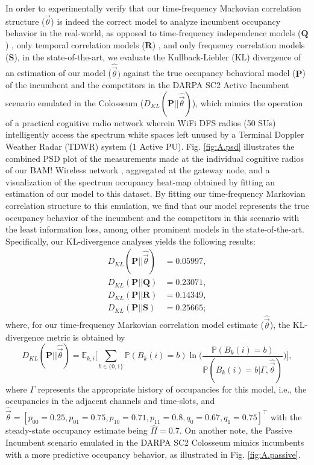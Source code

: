 \documentclass[12pt, draftcls, onecolumn]{IEEEtran}
\begin{document}
In order to experimentally verify that our time-frequency Markovian correlation structure ($\vec{\theta}$) is indeed the correct model to analyze incumbent occupancy behavior in the real-world, as opposed to time-frequency independence models ($\mathbf{Q}$) \cite{WCL:4, WCL:10, WCL:9, WCL:11, WCL:8}, only temporal correlation models ($\mathbf{R}$) \cite{WCL:5}, and only frequency correlation models ($\mathbf{S}$), in the state-of-the-art, we evaluate the Kullback-Liebler (KL) divergence of an estimation of our model ($\hat{\vec{\theta}})$ against the true occupancy behavioral model ($\mathbf{P}$) of the incumbent and the competitors in the DARPA SC2 Active Incumbent scenario emulated in the Colosseum \cite{DARPA:SC2, DARPA:SC2c2api, DARPA:ActiveIncumbent, DARPA:SC2scenarios} ($D_{KL}(\mathbf{P}{||}\hat{\vec{\theta}})$), which mimics the operation of a practical cognitive radio network wherein WiFi DFS radios (50 SUs) intelligently access the spectrum white spaces left unused by a Terminal Doppler Weather Radar (TDWR) system (1 Active PU). Fig. \ref{fig:A.psd} illustrates the combined PSD plot of the measurements made at the individual cognitive radios of our BAM! Wireless network \cite{BAM}, aggregated at the gateway node, and a visualization of the spectrum occupancy heat-map obtained by fitting an estimation of our model to this dataset. By fitting our time-frequency Markovian correlation structure to this emulation, we find that our model represents the true occupancy behavior of the incumbent and the competitors in this scenario with the least information loss, among other prominent models in the state-of-the-art. Specifically, our KL-divergence analyses yields the following results:
\begin{equation}
    \begin{aligned}
        D_{KL}(\mathbf{P}{||}\hat{\vec{\theta}}) &= 0.05997,\\
        D_{KL}(\mathbf{P}{||}\mathbf{Q}) &= 0.23071,\\
        D_{KL}(\mathbf{P}{||}\mathbf{R}) &= 0.14349,\\
        D_{KL}(\mathbf{P}{||}\mathbf{S}) &= 0.25665;
    \end{aligned}
\end{equation}
where, for our time-frequency Markovian correlation model estimate ($\hat{\vec{\theta}}$), the KL-divergence metric is obtained by
\begin{equation}
    D_{KL}(\mathbf{P}{||}\hat{\vec{\theta}}) = \mathbb{E}_{k,i}\Bigg[\sum_{b{\in}\{0,1\}}\mathbb{P}(B_{k}(i){=}b)\ln\Bigg(\frac{\mathbb{P}(B_{k}(i){=}b)}{\mathbb{P}(B_{k}(i){=}b|\Gamma, \hat{\vec{\theta}})}\Bigg)\Bigg],
\end{equation}
where $\Gamma$ represents the appropriate history of occupancies for this model, i.e., the occupancies in the adjacent channels and time-slots, and $\hat{\vec{\theta}} = [p_{00}=0.25,p_{01}=0.75,p_{10}=0.71,p_{11}=0.8,q_{0}=0.67,q_{1}=0.75]^{\intercal}$ with the steady-state occupancy estimate being $\hat{\Pi}{=}0.7$. On another note, the Passive Incumbent scenario \cite{DARPA:SC2pi} emulated in the DARPA SC2 Colosseum mimics incumbents with a more predictive occupancy behavior, as illustrated in Fig. \ref{fig:A.passive}.
\end{document}
